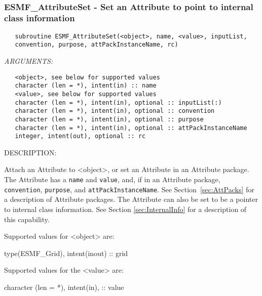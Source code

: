    
 
\mbox{}\hrulefill\ 
 
\subsubsection [ESMF\_AttributeSet] {ESMF\_AttributeSet - Set an Attribute to point to internal class information}


  
\begin{verbatim}   subroutine ESMF_AttributeSet(<object>, name, <value>, inputList,
   convention, purpose, attPackInstanceName, rc)\end{verbatim}{\em ARGUMENTS:}
\begin{verbatim}   <object>, see below for supported values
   character (len = *), intent(in) :: name
   <value>, see below for supported values
   character (len = *), intent(in), optional :: inputList(:)
   character (len = *), intent(in), optional :: convention
   character (len = *), intent(in), optional :: purpose
   character (len = *), intent(in), optional :: attPackInstanceName
   integer, intent(out), optional :: rc\end{verbatim}
{\sf DESCRIPTION:\\ }


   Attach an Attribute to <object>, or set an Attribute in an
   Attribute package. The Attribute has a {\tt name} and {\tt value},
   and, if in an Attribute package, {\tt convention}, {\tt purpose}, and
   {\tt attPackInstanceName}.
   See Section~\ref{sec:AttPacks} for a description of Attribute packages.
   The Attribute can
   also be set to be a pointer to internal class information. See Section
   \ref{sec:InternalInfo} for a description of this capability.
  
   Supported values for <object> are:
   \begin{description}
   \item type(ESMF\_Grid), intent(inout) :: grid
   \end{description}
  
   Supported values for the <value> are:
   \begin{description}
   \item character (len = *), intent(in), :: value
   \end{description}
  
